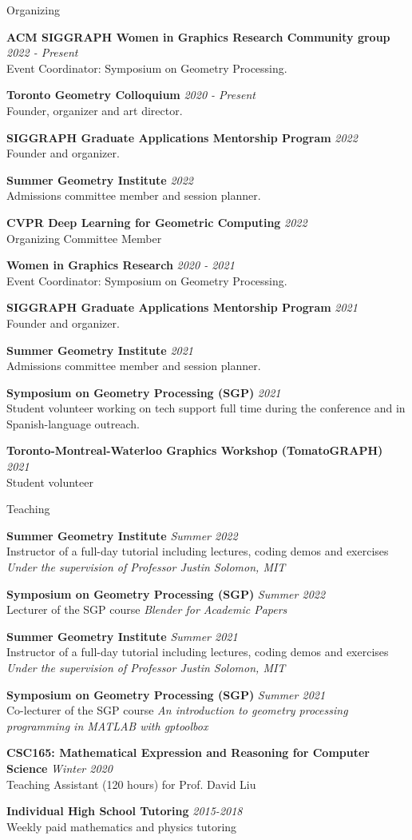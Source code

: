 \documentclass{resume}
\newcommand{\cvitembig}[4]{
    {\bf #1} \hfill {\em \small #2} \\ 
    {\small#3 }\\
    {\it \small #4}
}
\newcommand{\cvitem}[3]{
    {\bf #1} \hfill {\em \small #2} \\ 
    {\small#3 }
}
\begin{document}
\begin{rSection}{Organizing}

\cvitem{ACM SIGGRAPH Women in Graphics Research Community group}{2022 - Present}{Event Coordinator: Symposium on Geometry Processing.}
    
\cvitem{Toronto Geometry Colloquium}{2020 - Present}{Founder, organizer and art director.}

\cvitem{SIGGRAPH Graduate Applications Mentorship Program}{2022} 
{Founder and organizer.}

\cvitem{Summer Geometry Institute}{2022} 
{Admissions committee member and session planner.}

\cvitem{CVPR Deep Learning for Geometric Computing}{2022} 
{Organizing Committee Member}

\cvitem{Women in Graphics Research}{2020 - 2021}{Event Coordinator: Symposium on Geometry Processing.}

\cvitem{SIGGRAPH Graduate Applications Mentorship Program}{2021} 
{Founder and organizer.}

\cvitem{Summer Geometry Institute}{2021} 
{Admissions committee member and session planner.}

\cvitem{Symposium on Geometry Processing (SGP)}{2021} 
{Student volunteer working on tech support full time during the conference and in Spanish-language outreach.}

\cvitem{Toronto-Montreal-Waterloo Graphics Workshop (TomatoGRAPH)}{2021} 
{Student volunteer}





\end{rSection}


\begin{rSection}{Teaching}

\cvitembig{Summer Geometry Institute}{\em Summer 2022}{Instructor of a full-day tutorial including lectures, coding demos and exercises}{Under the supervision of Professor Justin Solomon, MIT}

\cvitem{Symposium on Geometry Processing (SGP)}{Summer 2022}{Lecturer of the SGP course {\it Blender for Academic Papers}}

\cvitembig{Summer Geometry Institute}{Summer 2021}{Instructor of a full-day tutorial including lectures, coding demos and exercises}{Under the supervision of Professor Justin Solomon, MIT}

\cvitem{Symposium on Geometry Processing (SGP)}{Summer 2021}{Co-lecturer of the SGP course {\it An introduction to geometry processing  programming in MATLAB with gptoolbox}}

\cvitem{CSC165: Mathematical Expression and Reasoning for Computer Science}{Winter 2020}{Teaching Assistant (120 hours) for Prof. David Liu}

\cvitem{Individual High School Tutoring}{2015-2018}{Weekly paid mathematics and physics tutoring}

\end{rSection}
\end{document}
